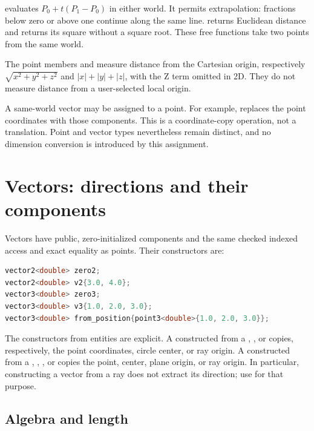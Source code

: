  evaluates
$P_0+t(P_1-P_0)$ in either world. It permits extrapolation: fractions below
zero or above one continue along the same line.  returns
Euclidean distance and  returns its square without a
square root. These free functions take two points from the same world.

The point members  and  measure
distance from the Cartesian origin, respectively
$\sqrt{x^2+y^2+z^2}$ and $|x|+|y|+|z|$, with the Z term omitted in 2D.
They do not measure distance from a user-selected local origin.

\begin{manualnote}
A same-world vector may be assigned to a point. For example,
 replaces the point coordinates with those
components. This is a coordinate-copy operation, not a translation. Point
and vector types nevertheless remain distinct, and no dimension conversion
is introduced by this assignment.
\end{manualnote}

\section{Vectors: directions and their components}

Vectors have public, zero-initialized components and the same checked indexed
access and exact equality as points. Their constructors are:

\begin{minipage}{\linewidth}
\begin{lstlisting}[language=C++]
vector2<double> zero2;
vector2<double> v2{3.0, 4.0};
vector3<double> zero3;
vector3<double> v3{1.0, 2.0, 3.0};
vector3<double> from_position{point3<double>{1.0, 2.0, 3.0}};
\end{lstlisting}
\end{minipage}

The constructors from entities are explicit. A  constructed
from a , , or  copies, respectively,
the point coordinates, circle center, or ray origin. A 
constructed from a , , , or
 copies the point, center, plane origin, or ray origin. In
particular, constructing a vector from a ray does not extract its direction;
use  for that purpose.

\subsection{Algebra and length}

